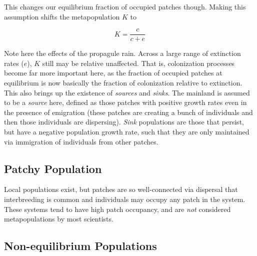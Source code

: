 \documentclass[12pt]{article}
\begin{document}
This changes our equilibrium fraction of occupied patches though. Making this assumption shifts the metapopulation $K$ to 

\begin{equation}
K = \frac{c}{c+e}
\end{equation}


Note here the effects of the propagule rain. Across a large range of extinction rates ($e$), $K$ still may be relative unaffected. That is, colonization processes become far more important here, as the fraction of occupied patches at equilibrium is now basically the fraction of colonization relative to extinction. This also brings up the existence of \textit{sources} and \textit{sinks}. The mainland is assumed to be a \textit{source} here, defined as those patches with positive growth rates even in the presence of emigration (these patches are creating a bunch of individuals and then those individuals are dispersing). \textit{Sink} populations are those that persist, but have a negative population growth rate, such that they are only maintained via immigration of individuals from other patches. 






\bigskip

\subsection*{Patchy Population}

Local populations exist, but patches are so well-connected via dispersal that interbreeding is common and individuals may occupy any patch in the system. These systems tend to have high patch occupancy, and are \textit{not} considered metapopulations by most scientists. 









\bigskip

\subsection*{Non-equilibrium Populations}
\end{document}
